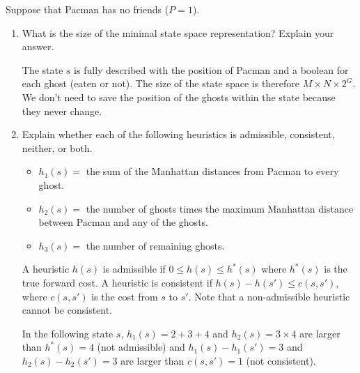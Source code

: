 \documentclass[11pt, a4paper]{article}
\begin{document}
Suppose that Pacman has no friends ($P=1$).

\begin{enumerate}
    \item What is the size of the minimal state space representation? Explain your answer.

    \begin{solution}
        The state $s$ is fully described with the position of Pacman and a boolean for each ghost (eaten or not). The size of the state space is therefore $M \times N \times 2^G$. We don't need to save the position of the ghosts within the state because they never change.
    \end{solution}

    \item Explain whether each of the following heuristics is admissible, consistent, neither, or both.
    \begin{itemize}[leftmargin=*]
        \item $h_1(s) =$ the sum of the Manhattan distances from Pacman to every ghost.
        \item $h_2(s) =$ the number of ghosts times the maximum Manhattan distance between Pacman and any of the ghosts.
        \item $h_3(s) =$ the number of remaining ghosts.
    \end{itemize}

    \begin{solution}
        A heuristic $h(s)$ is admissible if $0 \leq h(s) \leq h^*(s)$ where $h^*(s)$ is the true forward cost. A heuristic is consistent if $h(s) - h(s') \leq c(s, s')$, where $c(s, s')$ is the cost from $s$ to $s'$. Note that a non-admissible heuristic cannot be consistent.

        In the following state $s$, $h_1(s) = 2 + 3 + 4$ and $h_2(s) = 3 \times 4$ are larger than $h^*(s) = 4$ (not admissible) and $h_1(s) - h_1(s') = 3$ and $h_2(s) - h_2(s') = 3$ are larger than $c(s, s') = 1$ (not consistent).

        \begin{center}
\end{center}
\end{solution}
\end{enumerate}
\end{document}

